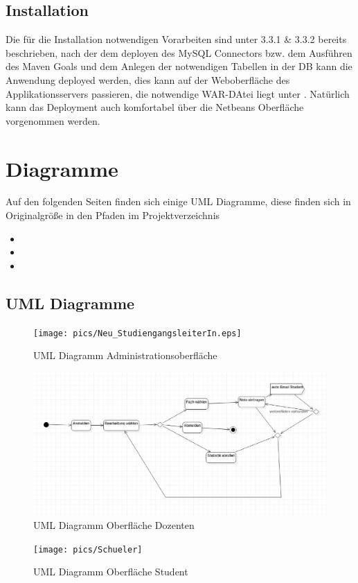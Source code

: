 \documentclass[12pt,a4paper,parskip]{scrreprt}
\begin{document}
\section{Installation}
Die für die Installation notwendigen Vorarbeiten sind unter 3.3.1 \& 3.3.2 bereits beschrieben, nach der dem deployen  des MySQL Connectors bzw. dem Ausführen des Maven Goals und dem Anlegen der notwendigen Tabellen in der DB kann die Anwendung deployed werden, dies kann auf der Weboberfläche des Applikationsservers passieren, die notwendige WAR-DAtei liegt unter . Natürlich kann das Deployment auch komfortabel über die Netbeans Oberfläche vorgenommen werden.
\chapter{Diagramme}
Auf den folgenden Seiten finden sich einige UML Diagramme, diese finden sich in Originalgröße in den Pfaden im Projektverzeichnis
\begin{itemize}
	\item {}
	\item {}
	\item {}
\end{itemize} 
\section{UML Diagramme}
\begin{figure}[!hbtp]%
\centering
\texttt{[image: pics/Neu\_StudiengangsleiterIn.eps]}
\caption[Admin]{UML Diagramm Administrationsoberfläche}
\label{fig:AdminE}
\end{figure}
\begin{figure}[!hbtp]%
\centering
\includegraphics[width=1\linewidth]{pics/neu_dozentIn.eps}
\caption[Oberfläche Dozenten]{UML Diagramm Oberfläche Dozenten}
\label{fig:DozentIn}
\end{figure}
\begin{figure}[h!]
\centering
\texttt{[image: pics/Schueler]}
\caption[Oberfläche Student]{UML Diagramm Oberfläche Student}
\label{fig:Schueler}
\end{figure}
\clearpage
\end{document}
